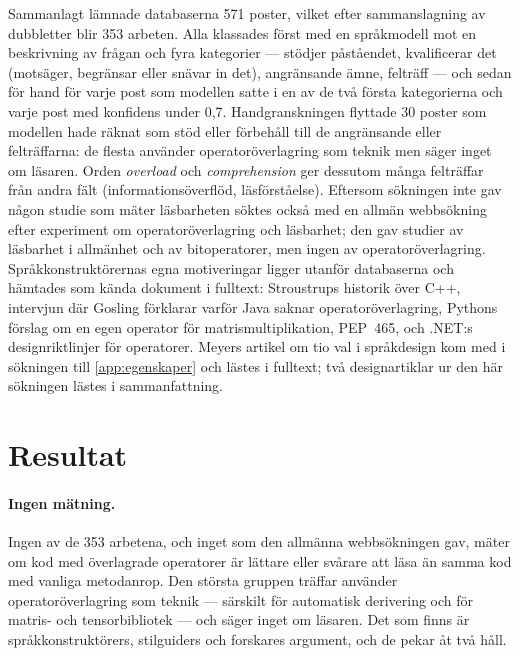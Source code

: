 Sammanlagt lämnade databaserna 571 poster, vilket efter
sammanslagning av dubbletter blir 353 arbeten.  Alla klassades först
med en språkmodell mot en beskrivning av frågan och fyra kategorier ---
stödjer påståendet, kvalificerar det (motsäger, begränsar eller snävar
in det), angränsande ämne, felträff --- och sedan för hand för varje
post som modellen satte i en av de två första kategorierna och varje
post med konfidens under 0,7.  Handgranskningen flyttade 30 poster som
modellen hade räknat som stöd eller förbehåll till de angränsande eller
felträffarna: de flesta använder operatoröverlagring som teknik men
säger inget om läsaren.  Orden
\emph{overload} och \emph{comprehension} ger dessutom många felträffar
från andra fält (informationsöverflöd, läsförståelse).
Eftersom sökningen inte gav någon studie som mäter läsbarheten söktes
också med en allmän webbsökning efter experiment om operatoröverlagring
och läsbarhet; den gav studier av läsbarhet i allmänhet och av
bitoperatorer, men ingen av operatoröverlagring.  Språkkonstruktörernas
egna motiveringar ligger utanför databaserna och hämtades som kända
dokument i fulltext: Stroustrups historik över
C++\autocite{Stroustrup1993History}, intervjun där Gosling förklarar
varför Java saknar operatoröverlagring\autocite{Sutter2000CFamily},
Pythons förslag om en egen operator för matrismultiplikation,
PEP~465\autocite{Smith2014PEP465}, och .NET:s designriktlinjer för
operatorer\autocite{Cwalina2008Operators}.  Meyers artikel om tio val i
språkdesign\autocite{Meyer2022RightWrong} kom med i sökningen till
\cref{app:egenskaper} och lästes i fulltext; två designartiklar ur den
här sökningen\autocite{MilesJohnson1998,IchikawaChiba2017} lästes i
sammanfattning.

\section{Resultat}
\label{sec:ovl-resultat}

\paragraph{Ingen mätning.}  Ingen av de 353 arbetena, och inget som den
allmänna webbsökningen gav, mäter om kod med överlagrade operatorer är
lättare eller svårare att läsa än samma kod med vanliga metodanrop.
Den största gruppen träffar använder operatoröverlagring som teknik ---
särskilt för automatisk derivering och för matris- och tensorbibliotek
--- och säger inget om läsaren.  Det som finns är språkkonstruktörers,
stilguiders och forskares argument, och de pekar åt två håll.

